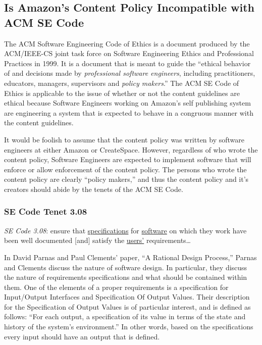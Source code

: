 \documentclass[11pt]{article}
\begin{document}
\begin{multicols}{2}
\subsection{Is Amazon's Content Policy Incompatible with ACM SE Code}

The ACM Software Engineering Code of Ethics is a document produced by the ACM/IEEE-CS joint task force on Software Engineering Ethics and Professional Practices in 1999. \cite{SECode} It is a document that is meant to guide the ``ethical behavior of and decisions made by \emph{professional software engineers}, including practitioners, educators, managers, supervisors and \emph{policy makers}.'' \cite[Emphasis Mine]{SECode} The ACM SE Code of Ethics is applicable to the issue of whether or not the content guidelines are ethical because Software Engineers working on Amazon's self publishing system are engineering a system that is expected to behave in a congruous manner with the content guidelines. %

It would be foolish to assume that the content policy was written by software engineers at either Amazon or CreateSpace.  However, regardless of who wrote the content policy, Software Engineers are expected to implement software that will enforce or allow enforcement of the content policy.  The persons who wrote the content policy are clearly ``policy makers,'' and thus the content policy and it's creators should abide by the tenets of the ACM SE Code.

\subsubsection{SE Code Tenet 3.08}

\emph{SE Code 3.08}: ensure that \underline{specifications} for \underline{software} on which they work have been well documented [and] satisfy the \underline{users'} requirements\ldots 

In David Parnas and Paul Clements' paper, ``A Rational Design Process,'' Parnas and Clements discuss the nature of software design. \cite{fakeit} In particular, they discuss the nature of requirements specifications and what should be contained within them.  One of the elements of a proper requirements is a specification for Input/Output Interfaces and Specification Of Output Values.  Their description for the Specification of Output Values is of particular interest, and is defined as follows: ``For each output, a specification of its value in terms of the state and history of the system's environment.'' \cite{fakeit} In other words, based on the specifications every input should have an output that is defined. 


\end{multicols}
\end{document}
